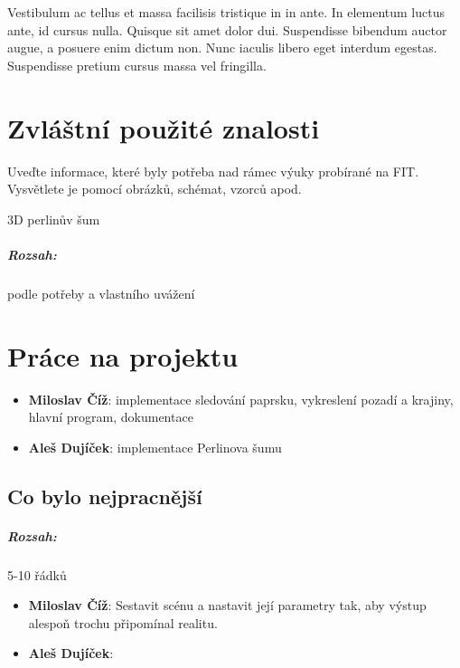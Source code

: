 \documentclass[12pt,a4paper,titlepage,final]{report}
\newcommand\AuthorA{Miloslav Číž}
\newcommand\AuthorB{Aleš Dujíček}
\begin{document}
Vestibulum ac tellus et massa facilisis tristique in in ante. In elementum luctus ante, id cursus nulla. Quisque sit amet dolor dui. Suspendisse bibendum auctor augue, a posuere enim dictum non. Nunc iaculis libero eget interdum egestas. Suspendisse pretium cursus massa vel fringilla.



\chapter{Zvláštní použité znalosti}

Uveďte informace, které byly potřeba nad rámec výuky probírané na FIT.
Vysvětlete je pomocí obrázků, schémat, vzorců apod.

3D perlinův šum

\paragraph{Rozsah:} podle potřeby a vlastního uvážení


\chapter{Práce na projektu}

\begin{itemize}
\item \textbf{\AuthorA}: implementace sledování paprsku, vykreslení pozadí a krajiny, hlavní program, dokumentace
\item \textbf{\AuthorB}: implementace Perlinova šumu
\end{itemize}

\section{Co bylo nejpracnější}

\paragraph{Rozsah:} 5-10 řádků

\begin{itemize}
\item \textbf{\AuthorA}: Sestavit scénu a nastavit její parametry tak,
aby výstup alespoň trochu připomínal realitu.
\item \textbf{\AuthorB}:
\end{itemize}
\end{document}
